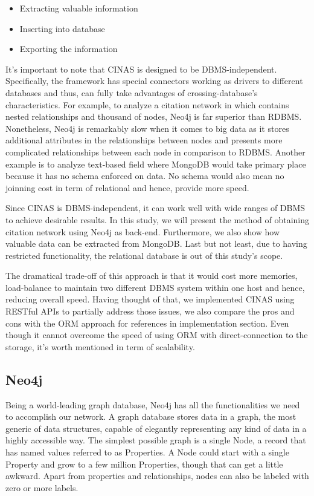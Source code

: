 \documentclass{sig-alternate}
\begin{document}
{\begin{itemize}
\item Extracting valuable information
\item Inserting into database
\item Exporting the information
\end{itemize}

It's important to note that CINAS is designed to be DBMS-independent. Specifically, the framework has special connectors working as drivers to different databases and thus, can fully take advantages of crossing-database's characteristics. For example, to analyze a citation network in which contains nested relationships and thousand of nodes,  Neo4j is far superior than RDBMS. Nonetheless, Neo4j is remarkably slow when it comes to big data as it stores additional attributes in the relationships between nodes and presents more complicated relationships between each node in comparison to RDBMS. Another example is to analyze text-based field where MongoDB would take primary place because it has no schema enforced on data. No schema would also mean no joinning cost in term of relational and hence, provide more speed. 

Since CINAS is DBMS-independent, it can work well with wide ranges of DBMS to achieve desirable results. In this study, we will present the method of obtaining citation network using Neo4j as back-end. Furthermore, we also show how valuable data can be extracted from MongoDB. Last but not least, due to having restricted functionality, the relational database is out of this study's scope.

The dramatical trade-off of this approach is that it would cost more memories, load-balance to maintain two different DBMS system within one host and hence, reducing overall speed. Having thought of that, we implemented CINAS using RESTful APIs to partially address those issues, we also compare the pros and cons with the ORM approach for references in implementation section. Even though it cannot overcome the speed of using ORM with direct-connection to the storage, it's worth mentioned in term of scalability.
\subsection{Neo4j }
Being a world-leading graph database, Neo4j has all the functionalities we need to accomplish our network. A graph database stores data in a graph, the most generic of data structures, capable of elegantly representing any kind of data in a highly accessible way. The simplest possible graph is a single Node, a record that has named values referred to as Properties. A Node could start with a single Property and grow to a few million Properties, though that can get a little awkward. Apart from properties and relationships, nodes can also be labeled with zero or more labels.

}
\end{document}
